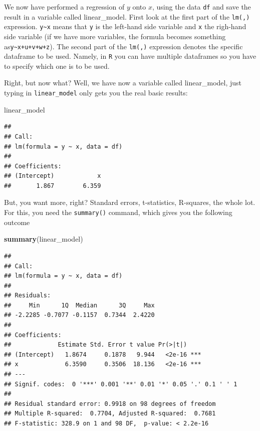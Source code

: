\documentclass[]{article}
\newenvironment{Shaded}{\begin{snugshade}}{\end{snugshade}}
\newcommand{\KeywordTok}[1]{\textcolor[rgb]{0.13,0.29,0.53}{\textbf{#1}}}
\newcommand{\NormalTok}[1]{#1}
\theoremstyle{definition}
\theoremstyle{definition}
\theoremstyle{definition}
\theoremstyle{remark}
\begin{document}
We now have performed a regression of \(y\) onto \(x\), using the data
\texttt{df} and save the result in a variable called linear\_model.
First look at the first part of the \texttt{lm(,)} expression.
\texttt{y\textasciitilde{}x} means that \texttt{y} is the left-hand side
variable and \texttt{x} the righ-hand side variable (if we have more
variables, the formula becomes something
as\texttt{y\textasciitilde{}x+u+v+w+z}). The second part of the
\texttt{lm(,)} expression denotes the specific dataframe to be used.
Namely, in \texttt{R} you can have multiple dataframes so you have to
specify which one is to be used.

Right, but now what? Well, we have now a variable called linear\_model,
just typing in \texttt{linear\_model} only gets you the real basic
results:

\begin{Shaded}
\begin{Highlighting}[]
\NormalTok{linear_model}
\end{Highlighting}
\end{Shaded}

\begin{verbatim}
## 
## Call:
## lm(formula = y ~ x, data = df)
## 
## Coefficients:
## (Intercept)            x  
##       1.867        6.359
\end{verbatim}

But, you want more, right? Standard errors, t-statistics, R-squares, the
whole lot. For this, you need the \texttt{summary()} command, which
gives you the following outcome

\begin{Shaded}
\begin{Highlighting}[]
\KeywordTok{summary}\NormalTok{(linear_model)}
\end{Highlighting}
\end{Shaded}

\begin{verbatim}
## 
## Call:
## lm(formula = y ~ x, data = df)
## 
## Residuals:
##     Min      1Q  Median      3Q     Max 
## -2.2285 -0.7077 -0.1157  0.7344  2.4220 
## 
## Coefficients:
##             Estimate Std. Error t value Pr(>|t|)    
## (Intercept)   1.8674     0.1878   9.944   <2e-16 ***
## x             6.3590     0.3506  18.136   <2e-16 ***
## ---
## Signif. codes:  0 '***' 0.001 '**' 0.01 '*' 0.05 '.' 0.1 ' ' 1
## 
## Residual standard error: 0.9918 on 98 degrees of freedom
## Multiple R-squared:  0.7704, Adjusted R-squared:  0.7681 
## F-statistic: 328.9 on 1 and 98 DF,  p-value: < 2.2e-16
\end{verbatim}
\end{document}
